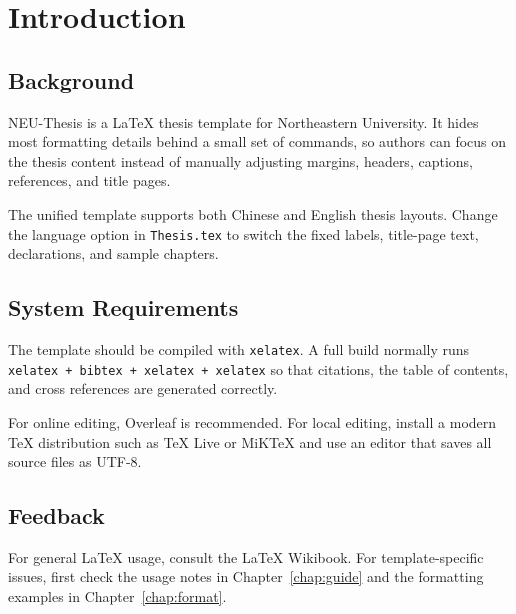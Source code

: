 \chapter{Introduction}\label{chap:introduction}

\section{Background}

NEU-Thesis is a \LaTeX{} thesis template for Northeastern University. It hides most formatting details behind a small set of commands, so authors can focus on the thesis content instead of manually adjusting margins, headers, captions, references, and title pages.

The unified template supports both Chinese and English thesis layouts. Change the language option in \texttt{Thesis.tex} to switch the fixed labels, title-page text, declarations, and sample chapters.

\section{System Requirements}\label{sec:system}

The template should be compiled with \texttt{xelatex}. A full build normally runs \texttt{xelatex + bibtex + xelatex + xelatex} so that citations, the table of contents, and cross references are generated correctly.

For online editing, Overleaf is recommended. For local editing, install a modern \TeX{} distribution such as \TeX{} Live or MiK\TeX{} and use an editor that saves all source files as UTF-8.

\section{Feedback}

For general \LaTeX{} usage, consult the \LaTeX{} Wikibook\cite{wikibook2014latex}. For template-specific issues, first check the usage notes in Chapter~\ref{chap:guide} and the formatting examples in Chapter~\ref{chap:format}.
